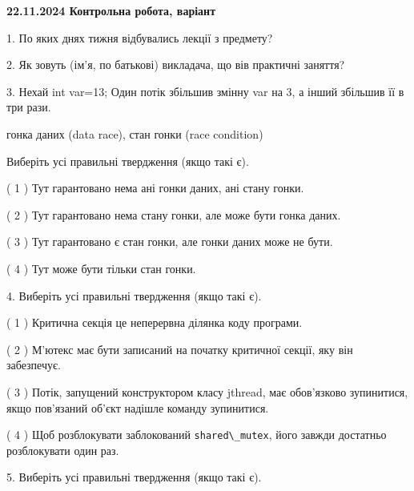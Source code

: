 \documentclass[12pt, ukrainian]{article}
\def\code#1{\Verb!#1!}
\begin{document}
\vspace{4mm}
\newpage
\begin {large}

\textbf{22.11.2024 Контрольна робота, варіант  }\par


{
1. По яких днях тижня відбувались лекції з предмету?



\vspace{5mm}
2. Як зовуть (ім'я, по батькові) викладача, що вів практичні заняття?



\vspace{5mm}
3. Нехай int var=13; Один потік збільшив змінну var на 3, а інший збільшив її в три рази.

гонка даних (data race), стан гонки (race condition)

Виберіть усі правильні твердження (якщо такі є).\par
\vspace{2mm}
( 1 ) Тут гарантовано нема ані гонки даних, ані стану гонки.%

( 2 ) Тут гарантовано нема стану гонки, але може бути гонка даних.%

( 3 ) Тут гарантовано є стан гонки, але гонки даних може не бути.%

( 4 ) Тут може бути тільки стан гонки.%


\vspace{5mm}
4. Виберіть усі правильні твердження (якщо такі є).\par
\vspace{2mm}

( 1 ) Критична секція це неперервна ділянка коду програми.%

( 2 ) М’ютекс має бути записаний на початку критичної секції, яку він забезпечує.%

( 3 ) Потік, запущений конструктором класу jthread, має обов’язково зупинитися, якщо пов’язаний об’єкт надішле команду зупинитися.%

( 4 ) Щоб розблокувати заблокований \code{shared\_mutex}, його завжди достатньо розблокувати один раз.%


\vspace{5mm}
5. Виберіть усі правильні твердження (якщо такі є).\par
\vspace{2mm}

}
\end{large}
\end{document}
